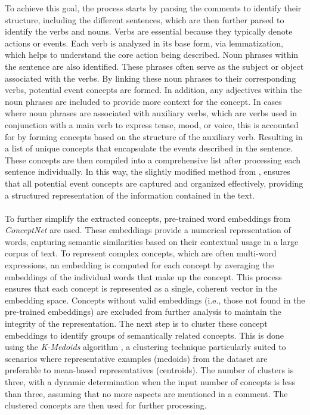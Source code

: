 \documentclass[sn-mathphys-num]{sn-jnl}%
\theoremstyle{thmstyleone}%
\theoremstyle{thmstyletwo}%
\theoremstyle{thmstylethree}%
\begin{document}
    To achieve this goal, the process starts by parsing the comments to identify their structure, including the different sentences, which are then further parsed to identify the verbs and nouns. Verbs are essential because they typically denote actions or events. Each verb is analyzed in its base form, via lemmatization, which helps to understand the core action being described. Noun phrases within the sentence are also identified. These phrases often serve as the subject or object associated with the verbs. By linking these noun phrases to their corresponding verbs, potential event concepts are formed. In addition, any adjectives within the noun phrases are included to provide more context for the concept.  In cases where noun phrases are associated with auxiliary verbs, which are verbs used in conjunction with a main verb to express tense, mood, or voice, this is accounted for by forming concepts based on the structure of the auxiliary verb.
    Resulting in a list of unique concepts that encapsulate the events described in the sentence. These concepts are then compiled into a comprehensive list after processing each sentence individually. In this way, the slightly modified method from \cite{10.1145/2487788.2487995}, ensures that all potential event concepts are captured and organized effectively, providing a structured representation of the information contained in the text.\\\\
    To further simplify the extracted concepts, pre-trained word embeddings from \textit{ConceptNet} are used. These embeddings provide a numerical representation of words, capturing semantic similarities based on their contextual usage in a large corpus of text. To represent complex concepts, which are often multi-word expressions, an embedding is computed for each concept by averaging the embeddings of the individual words that make up the concept. This process ensures that each concept is represented as a single, coherent vector in the embedding space. Concepts without valid embeddings (i.e., those not found in the pre-trained embeddings) are excluded from further analysis to maintain the integrity of the representation. The next step is to cluster these concept embeddings to identify groups of semantically related concepts. This is done using the \textit{K-Medoids} algorithm \cite{PARK20093336}, a clustering technique particularly suited to scenarios where representative examples (medoids) from the dataset are preferable to mean-based representatives (centroids). The number of clusters is three, with a dynamic determination when the input number of concepts is less than three, assuming that no more aspects are mentioned in a comment. The clustered concepts are then used for further processing.\\\\
\end{document}
